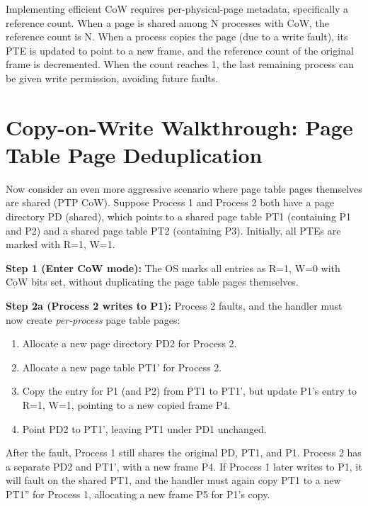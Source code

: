 \documentclass[11pt]{article}
\begin{document}
\begin{keyidea}
Implementing efficient CoW requires per-physical-page metadata, specifically a reference count. When a page is shared among N processes with CoW, the reference count is N. When a process copies the page (due to a write fault), its PTE is updated to point to a new frame, and the reference count of the original frame is decremented. When the count reaches 1, the last remaining process can be given write permission, avoiding future faults.
\end{keyidea}

\section{Copy-on-Write Walkthrough: Page Table Page Deduplication}

Now consider an even more aggressive scenario where page table pages themselves are shared (PTP CoW). Suppose Process 1 and Process 2 both have a page directory PD (shared), which points to a shared page table PT1 (containing P1 and P2) and a shared page table PT2 (containing P3). Initially, all PTEs are marked with R=1, W=1.

\textbf{Step 1 (Enter CoW mode):} The OS marks all entries as R=1, W=0 with CoW bits set, without duplicating the page table pages themselves.

\textbf{Step 2a (Process 2 writes to P1):} Process 2 faults, and the handler must now create \emph{per-process} page table pages:
\begin{enumerate}
    \item Allocate a new page directory PD2 for Process 2.
    \item Allocate a new page table PT1' for Process 2.
    \item Copy the entry for P1 (and P2) from PT1 to PT1', but update P1's entry to R=1, W=1, pointing to a new copied frame P4.
    \item Point PD2 to PT1', leaving PT1 under PD1 unchanged.
\end{enumerate}

After the fault, Process 1 still shares the original PD, PT1, and P1. Process 2 has a separate PD2 and PT1', with a new frame P4. If Process 1 later writes to P1, it will fault on the shared PT1, and the handler must again copy PT1 to a new PT1'' for Process 1, allocating a new frame P5 for P1's copy.
\end{document}
